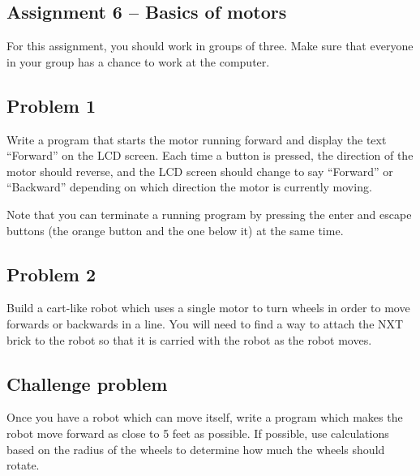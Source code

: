 \documentclass[11pt]{article}
\theoremstyle{plain}
\theoremstyle{definition}
\theoremstyle{remark}
\begin{document}
\begin{center}
\section*{Assignment 6 -- Basics of motors}
\end{center}
For this assignment, you should work in groups of three. Make sure that everyone
in your group has a chance to work at the computer.\\
\subsection*{Problem 1}
Write a program that starts the motor running forward and display the text
``Forward'' on the LCD screen. Each time a button is pressed, the direction of
the motor should reverse, and the LCD screen should change to say ``Forward'' or
``Backward'' depending on which direction the motor is currently moving.

Note that you can terminate a running program by pressing the enter and escape
buttons (the orange button and the one below it) at the same time.

\subsection*{Problem 2}
Build a cart-like robot which uses a single motor to turn wheels in order to
move forwards or backwards in a line. You will need to find a way to attach the
NXT brick to the robot so that it is carried with the robot as the robot moves.

\subsection*{Challenge problem}
Once you have a robot which can move itself, write a program which makes the
robot move forward as close to 5 feet as possible. If possible, use calculations
based on the radius of the wheels to determine how much the wheels should
rotate.
\end{document}

